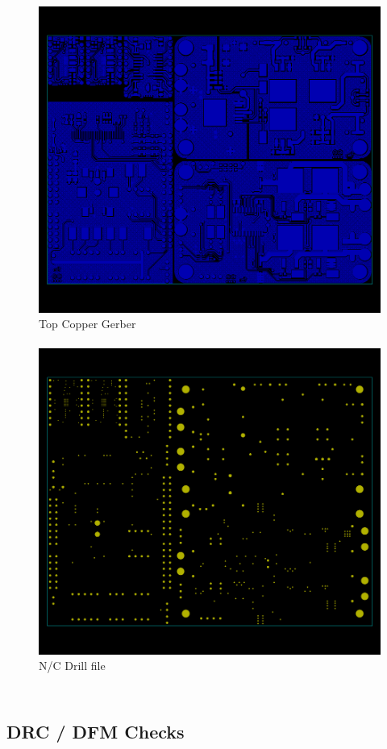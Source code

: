 \documentclass{beamer}
\begin{document}
\begin{frame}
\begin{columns}[t]
\begin{figure}
  \centering
  \includegraphics[width=0.75\columnwidth]{images-dis5/refcar-top} \\
  Top Copper Gerber \\
  \hfill \\
  \includegraphics[width=0.75\columnwidth]{images-dis5/refcar-drill} \\
  N/C Drill file
\end{figure}
\end{columns}
\end{frame}

\subsection{DRC / DFM Checks}
\end{document}
